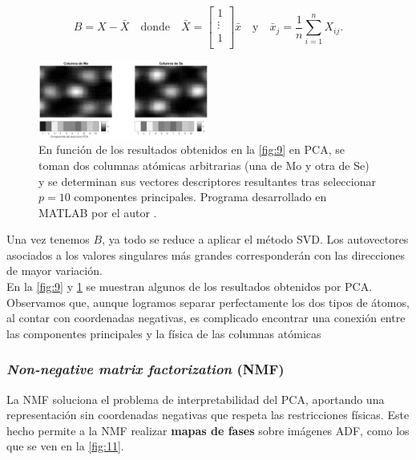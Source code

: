 \begin{equation}
    B = X - \bar X \quad \text{donde} \quad
    \bar X = 
    \begin{bmatrix}
    1        \\
    \vdots   \\
    1        \\
    \end{bmatrix} \bar x \quad \text{y} \quad
    \bar x_j = \frac{1}{n} \sum^n_{i=1} X_{ij}.
\end{equation}

\begin{figure}
    \centering
    \includegraphics[width=0.5\textwidth]{fig/Fig10.png}
    \caption{En función de los resultados obtenidos en la \autoref{fig:9} en PCA, se toman dos columnas atómicas arbitrarias (una de Mo y otra de Se) y se determinan sus vectores descriptores resultantes tras seleccionar $p = 10$ componentes principales. Programa desarrollado en MATLAB por el autor \cite{repo}.}
    \label{fig:10}
\end{figure} 

Una vez tenemos $B$, ya todo se reduce a aplicar el método SVD. Los autovectores asociados a los valores singulares más grandes corresponderán con las direcciones de mayor variación.\\



En la \autoref{fig:9} y \ref{fig:10} se muestran algunos de los resultados obtenidos por PCA. Observamos que, aunque logramos separar perfectamente los dos tipos de átomos, al contar con coordenadas negativas, es complicado encontrar una conexión entre las componentes principales y la física de las columnas atómicas


\subsubsection{\textit{Non-negative matrix factorization} (NMF)}

La NMF soluciona el problema de interpretabilidad del PCA, aportando una representación sin coordenadas negativas que respeta las restricciones físicas. Este hecho permite a la NMF realizar \textbf{mapas de fases} sobre imágenes ADF, como los que se ven en la \autoref{fig:11}.\\

